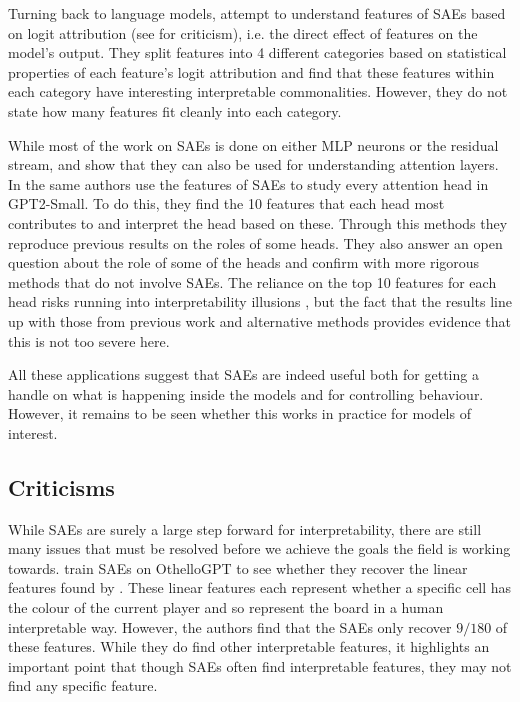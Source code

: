 Turning back to language models, \textcite{bloom_understanding_2024} attempt to understand features of SAEs based on logit attribution \parencite{nostalgebraist_interpreting_2020} (see \textcite{dao_adversarial_2023} for criticism), i.e. the direct effect of features on the model's output.
They split features into 4 different categories based on statistical properties of each feature's logit attribution and find that these features within each category have interesting interpretable commonalities.
However, they do not state how many features fit cleanly into each category.

While most of the work on SAEs is done on either MLP neurons or the residual stream, \textcite{kissane_sparse_2024} and \textcite{kissane_attention_2024} show that they can also be used for understanding attention layers.
In \textcite{krzyzanowski_we_2024} the same authors use the features of SAEs to study every attention head in GPT2-Small.
To do this, they find the 10 features that each head most contributes to and interpret the head based on these.
Through this methods they reproduce previous results on the roles of some heads.
They also answer an open question about the role of some of the heads and confirm with more rigorous methods that do not involve SAEs.
The reliance on the top 10 features for each head risks running into interpretability illusions \parencite{bolukbasi_interpretability_2021}, but the fact that the results line up with those from previous work and alternative methods provides evidence that this is not too severe here. 

All these applications suggest that SAEs are indeed useful both for getting a handle on what is happening inside the models and for controlling behaviour.
However, it remains to be seen whether this works in practice for models of interest.

\subsection{Criticisms}
While SAEs are surely a large step forward for interpretability, there are still many issues that must be resolved before we achieve the goals the field is working towards.
\textcite{huben_research_2024} train SAEs on OthelloGPT \parencite{li_emergent_2023} to see whether they recover the linear features found by \textcite{neel_nanda_actually_2023}.
These linear features each represent whether a specific cell has the colour of the current player and so represent the board in a human interpretable way.
However, the authors find that the SAEs only recover $9/180$ of these features.
While they do find other interpretable features, it highlights an important point that though SAEs often find interpretable features, they may not find any specific feature.

